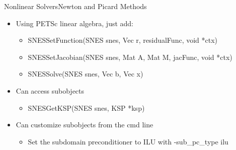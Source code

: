 \begin{frame}{Nonlinear Solvers}{Newton and Picard Methods}

\begin{itemize}
  \item Using PETSc linear algebra, just add:
  \begin{itemize}
    \item {\kb SNESSetFunction(SNES snes, Vec r, residualFunc, void *ctx)}
    \item {\kb SNESSetJacobian(SNES snes, Mat A, Mat M, jacFunc, void *ctx)}
    \item {\kb SNESSolve(SNES snes, Vec b, Vec x)}
  \end{itemize}

  \item Can access subobjects
  \begin{itemize}
    \item {\kb SNESGetKSP(SNES snes, KSP *ksp)}
  \end{itemize}

  \item Can customize subobjects from the cmd line
  \begin{itemize}
    \item Set the subdomain preconditioner to ILU with {\kb -sub\_pc\_type ilu} 
  \end{itemize}
\end{itemize}

\end{frame}
